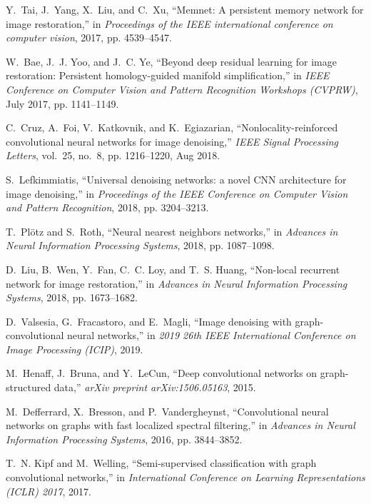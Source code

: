 \documentclass[journal]{IEEEtran}
\begin{document}
\begin{thebibliography}{10}
Y.~Tai, J.~Yang, X.~Liu, and C.~Xu, ``Memnet: A persistent memory network for
  image restoration,'' in \emph{Proceedings of the IEEE international
  conference on computer vision}, 2017, pp. 4539--4547.

W.~Bae, J.~J. Yoo, and J.~C. Ye, ``Beyond deep residual learning for image
  restoration: Persistent homology-guided manifold simplification,'' in
  \emph{IEEE Conference on Computer Vision and Pattern Recognition Workshops
  (CVPRW)}, July 2017, pp. 1141--1149.

C.~Cruz, A.~Foi, V.~Katkovnik, and K.~Egiazarian, ``Nonlocality-reinforced
  convolutional neural networks for image denoising,'' \emph{IEEE Signal
  Processing Letters}, vol.~25, no.~8, pp. 1216--1220, Aug 2018.

S.~Lefkimmiatis, ``{Universal denoising networks: a novel CNN architecture for
  image denoising},'' in \emph{Proceedings of the IEEE Conference on Computer
  Vision and Pattern Recognition}, 2018, pp. 3204--3213.

T.~Pl{\"o}tz and S.~Roth, ``Neural nearest neighbors networks,'' in
  \emph{Advances in Neural Information Processing Systems}, 2018, pp.
  1087--1098.

D.~Liu, B.~Wen, Y.~Fan, C.~C. Loy, and T.~S. Huang, ``Non-local recurrent
  network for image restoration,'' in \emph{Advances in Neural Information
  Processing Systems}, 2018, pp. 1673--1682.

D.~Valsesia, G.~Fracastoro, and E.~Magli, ``Image denoising with
  graph-convolutional neural networks,'' in \emph{2019 26th IEEE International
  Conference on Image Processing (ICIP)}, 2019.

M.~Henaff, J.~Bruna, and Y.~LeCun, ``Deep convolutional networks on
  graph-structured data,'' \emph{arXiv preprint arXiv:1506.05163}, 2015.

M.~Defferrard, X.~Bresson, and P.~Vandergheynst, ``Convolutional neural
  networks on graphs with fast localized spectral filtering,'' in
  \emph{Advances in Neural Information Processing Systems}, 2016, pp.
  3844--3852.

T.~N. Kipf and M.~Welling, ``Semi-supervised classification with graph
  convolutional networks,'' in \emph{International Conference on Learning
  Representations (ICLR) 2017}, 2017.


\end{thebibliography}
\end{document}
